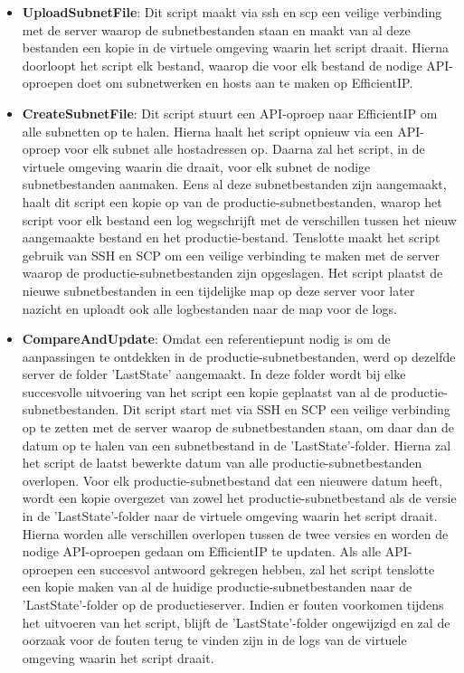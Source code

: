 \begin{itemize}
    \item \textbf{UploadSubnetFile}: Dit script maakt via \acrshort{ssh} en \acrshort{scp} een veilige verbinding met de server waarop de subnetbestanden staan en maakt van al deze bestanden een kopie in de virtuele omgeving waarin het script draait. Hierna doorloopt het script elk bestand, waarop die voor elk bestand de nodige API-oproepen doet om subnetwerken en hosts aan te maken op EfficientIP.
    \item \textbf{CreateSubnetFile}: Dit script stuurt een API-oproep naar EfficientIP om alle subnetten op te halen. Hierna haalt het script opnieuw via een API-oproep voor elk subnet alle hostadressen op. Daarna zal het script, in de virtuele omgeving waarin die draait, voor elk subnet de nodige subnetbestanden aanmaken. Eens al deze subnetbestanden zijn aangemaakt, haalt dit script een kopie op van de productie-subnetbestanden, waarop het script voor elk bestand een log wegschrijft met de verschillen tussen het nieuw aangemaakte bestand en het productie-bestand. Tenslotte maakt het script gebruik van SSH en SCP om een veilige verbinding te maken met de server waarop de productie-subnetbestanden zijn opgeslagen. Het script plaatst de nieuwe subnetbestanden in een tijdelijke map op deze server voor later nazicht en uploadt ook alle logbestanden naar de map voor de logs.
    \item \textbf{CompareAndUpdate}: Omdat een referentiepunt nodig is om de aanpassing\-en te ontdekken in de productie-subnetbestanden, werd op dezelfde server de folder 'LastState' aangemaakt. In deze folder wordt bij elke succesvolle uitvoering van het script een kopie geplaatst van al de productie-subnetbestan\-den. Dit script start met via SSH en SCP een veilige verbinding op te zetten met de server waarop de subnetbestanden staan, om daar dan de datum op te halen van een subnetbestand in de 'LastState'-folder. Hierna zal het script de laatst bewerkte datum van alle productie-subnetbestanden overlopen. Voor elk productie-subnetbestand dat een nieuwere datum heeft, wordt een kopie overgezet van zowel het productie-subnetbestand als de versie in de 'LastState'-folder naar de virtuele omgeving waarin het script draait. Hierna worden alle verschillen overlopen tussen de twee versies en worden de nodige API-oproepen gedaan om EfficientIP te updaten. Als alle API-oproepen een succesvol antwoord gekregen hebben, zal het script tenslotte een kopie maken van al de huidige productie-subnetbestanden naar de 'LastState'-folder op de productieserver. Indien er fouten voorkomen tijdens het uitvoeren van het script, blijft de 'LastState'-folder ongewijzigd en zal de oorzaak voor de fouten terug te vinden zijn in de logs van de virtuele omgeving waarin het script draait.
\end{itemize}

